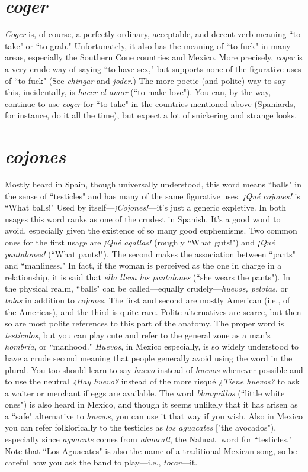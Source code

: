 \section{\emph{coger}}

\emph{Coger} is, of course, a perfectly ordinary, acceptable, and decent
verb meaning ``to take" or ``to grab." Unfortunately, it also has the
meaning of ``to fuck" in many areas, especially the Southern Cone
countries and Mexico. More precisely, \emph{coger} is a very crude way of saying ``to have sex," but supports none of the figurative uses of ``to fuck"
(See \emph{chingar} and \emph{joder}.) The more poetic (and polite) way to say this,
incidentally, is \emph{hacer el amor} (``to make love"). You can, by the way,
continue to use \emph{coger} for ``to take" in the countries mentioned above
(Spaniards, for instance, do it all the time), but expect a lot of snickering and strange looks.

\section{\emph{cojones}}

Mostly heard in Spain, though universally understood, this
word means ``balls" in the sense of ``testicles" and has many of the
same figurative uses. \emph{¡Qué cojones!} is ``What balls!" Used by itself---\emph{¡Cojones!}---it's just a generic expletive. In both usages this word ranks
as one of the crudest in Spanish. It's a good word to avoid, especially
given the existence of so many good euphemisms. Two common ones
for the first usage are \emph{¡Qué agallas!} (roughly ``What guts!") and \emph{¡Qué
pantalones!} (``What pants!"). The second makes the association between ``pants" and ``manliness." In fact, if the woman is perceived as
the one in charge in a relationship, it is said that \emph{ella lleva los pantalones} (``she wears the pants").
In the physical realm, ``balls" can be called---equally
crudely---\emph{huevos, pelotas}, or \emph{bolas} in addition to \emph{cojones}. The first
and second are mostly American (i.e., of the Americas), and the third is
quite rare. Polite alternatives are scarce, but then so are most polite
references to this part of the anatomy. The proper word is \emph{testículos},
but you can play cute and refer to the general zone as a man's \emph{hombría},
or ``manhood."
\emph{Huevos}, in Mexico especially, is so widely understood to have
a crude second meaning that people generally avoid using the word in
the plural. You too should learn to say \emph{huevo} instead of \emph{huevos} whenever possible and to use the neutral \emph{¿Hay huevo?} instead of the more
risqué \emph{¿Tiene huevos?} to ask a waiter or merchant if eggs are available.
The word \emph{blanquillos} (``little white ones") is also heard in Mexico, and
though it seems unlikely that it has arisen as a ``safe" alternative to
\emph{huevos}, you can use it that way if you wish. Also in Mexico you can
refer folklorically to the testicles as \emph{los aguacates} ["the avocados"),
especially since \emph{aguacate} comes from \emph{ahuacatl}, the Nahuatl word
for ``testicles." Note that ``Los Aguacates" is also the name of a traditional Mexican song, so be careful how you ask the band to play---i.e.,
\emph{tocar}---it.

